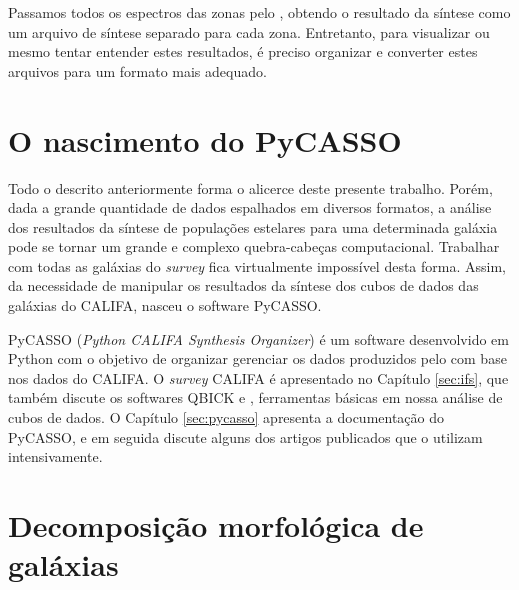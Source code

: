 Passamos todos os espectros das zonas pelo \starlight, obtendo o resultado da
síntese como um arquivo de síntese separado para cada zona. Entretanto, para
visualizar ou mesmo tentar entender estes resultados, é preciso organizar e
converter estes arquivos para um formato mais adequado.



\section{O nascimento do PyCASSO}

Todo o descrito anteriormente forma o alicerce deste presente trabalho. Porém,
dada a grande quantidade de dados espalhados em diversos formatos, a análise dos
resultados da síntese de populações estelares para uma determinada galáxia pode
se tornar um grande e complexo quebra-cabeças computacional. Trabalhar com todas
as galáxias do {\em survey} fica virtualmente impossível desta forma. Assim, da
necessidade de manipular os resultados da síntese dos cubos de dados das
galáxias do CALIFA, nasceu o software PyCASSO.

PyCASSO ({\em Python CALIFA \starlight Synthesis Organizer}) é um software
desenvolvido em Python com o objetivo de organizar gerenciar os dados produzidos
pelo \starlight com base nos dados do CALIFA. O {\em survey} CALIFA é
apresentado no Capítulo \ref{sec:ifs}, que também discute os softwares QBICK e
\starlight, ferramentas básicas em nossa análise de cubos de dados. O Capítulo
\ref{sec:pycasso} apresenta a documentação do PyCASSO, e em seguida discute
alguns dos artigos publicados que o utilizam intensivamente.



\section{Decomposição morfológica de galáxias}

